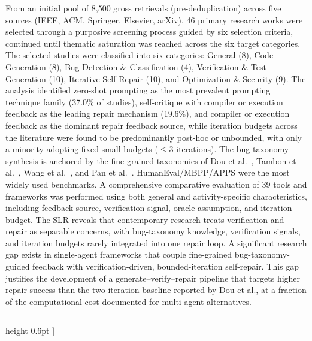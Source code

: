 \documentclass[10pt,a4paper]{article}
\newenvironment{topminipage}[1]{\begin{minipage}[t]{#1}}{\end{minipage}}
\begin{document}
\begin{topminipage}{0.70\textwidth}
{From an initial pool of 8,500 gross retrievals (pre-deduplication) across five sources (IEEE, ACM, Springer, Elsevier, arXiv), 46 primary research works were selected through a purposive screening process guided by six selection criteria, continued until thematic saturation was reached across the six target categories. The selected studies were classified into six categories: General (8), Code Generation (8), Bug Detection \& Classification (4), Verification \& Test Generation (10), Iterative Self-Repair (10), and Optimization \& Security (9). The analysis identified zero-shot prompting as the most prevalent prompting technique family (37.0\% of studies), self-critique with compiler or execution feedback as the leading repair mechanism (19.6\%), and compiler or execution feedback as the dominant repair feedback source, while iteration budgets across the literature were found to be predominantly post-hoc or unbounded, with only a minority adopting fixed small budgets ($\leq$3 iterations). The bug-taxonomy synthesis is anchored by the fine-grained taxonomies of Dou et al.~\cite{dou2026}, Tambon et al.~\cite{tambon2025}, Wang et al.~\cite{wang2025where}, and Pan et al.~\cite{pan2024lost}. HumanEval/MBPP/APPS were the most widely used benchmarks. A comprehensive comparative evaluation of 39 tools and frameworks was performed using both general and activity-specific characteristics, including feedback source, verification signal, oracle assumption, and iteration budget.
\noindent
The SLR reveals that contemporary research treats verification and repair as separable concerns, with bug-taxonomy knowledge, verification signals, and iteration budgets rarely integrated into one repair loop. A significant research gap exists in single-agent frameworks that couple fine-grained bug-taxonomy-guided feedback with verification-driven, bounded-iteration self-repair. This gap justifies the development of a generate--verify--repair pipeline that targets higher repair success than the two-iteration baseline reported by Dou et al., at a fraction of the computational cost documented for multi-agent alternatives.
}
\end{topminipage}
\par\vspace{0.8em}
\hrule height 0.6pt
\vspace{0.75em}
\endgroup
]

\end{document}
